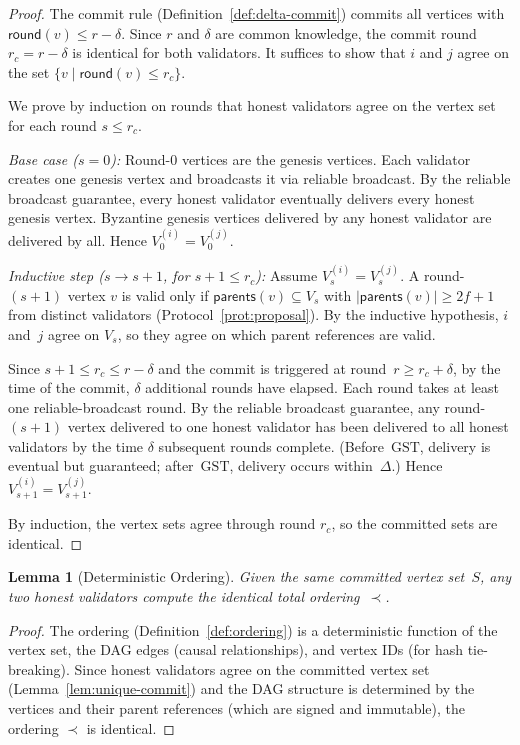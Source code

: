 \documentclass[11pt,a4paper]{article}
\newtheorem{lemma}[theorem]{Lemma}
\theoremstyle{definition}
\theoremstyle{remark}
\newcommand{\GST}{\mathrm{GST}}
\newcommand{\round}{\mathsf{round}}
\newcommand{\order}{\prec}
\begin{document}
\begin{proof}
The commit rule (Definition~\ref{def:delta-commit}) commits all vertices
with $\round(v) \leq r - \delta$.
Since $r$ and $\delta$ are common knowledge, the commit round
$r_c = r - \delta$ is identical for both validators.
It suffices to show that $i$ and $j$ agree on the set
$\{v \mid \round(v) \leq r_c\}$.

We prove by induction on rounds that honest validators agree on the
vertex set for each round $s \leq r_c$.

\emph{Base case ($s = 0$):}
Round-0 vertices are the genesis vertices.
Each validator creates one genesis vertex and broadcasts it via
reliable broadcast.
By the reliable broadcast guarantee, every honest validator eventually
delivers every honest genesis vertex.
Byzantine genesis vertices delivered by any honest validator are
delivered by all.
Hence $V_0^{(i)} = V_0^{(j)}$.

\emph{Inductive step ($s \to s+1$, for $s+1 \leq r_c$):}
Assume $V_s^{(i)} = V_s^{(j)}$.
A round-$(s\!+\!1)$ vertex $v$ is valid only if
$\mathsf{parents}(v) \subseteq V_s$ with $|\mathsf{parents}(v)| \geq 2f+1$
from distinct validators (Protocol~\ref{prot:proposal}).
By the inductive hypothesis, $i$ and~$j$ agree on $V_s$, so they agree
on which parent references are valid.

Since $s+1 \leq r_c \leq r - \delta$ and the commit is triggered at
round~$r \geq r_c + \delta$, by the time of the commit, $\delta$
additional rounds have elapsed.
Each round takes at least one reliable-broadcast round.
By the reliable broadcast guarantee, any round-$(s\!+\!1)$ vertex
delivered to one honest validator has been delivered to all honest
validators by the time $\delta$ subsequent rounds complete.
(Before~$\GST$, delivery is eventual but guaranteed;
after~$\GST$, delivery occurs within~$\Delta$.)
Hence $V_{s+1}^{(i)} = V_{s+1}^{(j)}$.

By induction, the vertex sets agree through round $r_c$, so
the committed sets are identical.
\end{proof}

\begin{lemma}[Deterministic Ordering]\label{lem:deterministic-ordering}
Given the same committed vertex set~$S$, any two honest validators compute
the identical total ordering~$\order$.
\end{lemma}

\begin{proof}
The ordering (Definition~\ref{def:ordering}) is a deterministic function
of the vertex set, the DAG edges (causal relationships), and vertex IDs
(for hash tie-breaking).
Since honest validators agree on the committed vertex set
(Lemma~\ref{lem:unique-commit}) and the DAG structure is determined by
the vertices and their parent references (which are signed and immutable),
the ordering $\order$ is identical.
\end{proof}
\end{document}
